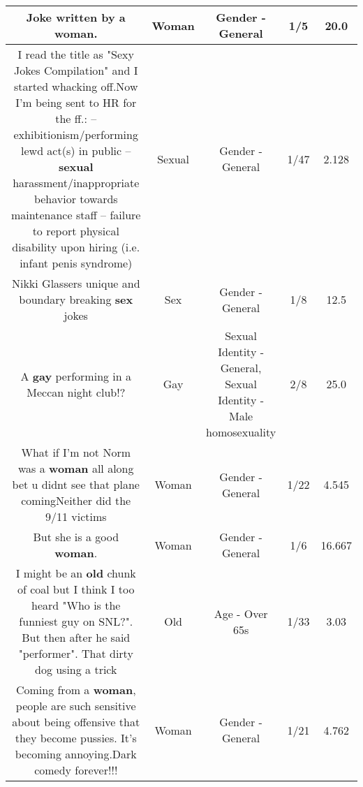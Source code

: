 \documentclass[11pt]{article}
\newlength\mylength
\begin{document}
\begin{center}
\begin{longtable}{|C{.65\mylength}|C{.30\mylength}|C{.12\mylength}|C{.12\mylength}|C{.12\mylength}|}
  \small Joke written by a \textbf{woman}.\normalsize   & Woman & Gender - General & 1/5 & 20.0 \\  \hline
  \small I read the title as "Sexy Jokes Compilation" and I started whacking off.Now I'm being sent to HR for the ff.:  -- exhibitionism/performing lewd act(s) in public  -- \textbf{sexual} harassment/inappropriate behavior towards maintenance staff  -- failure to report physical disability upon hiring (i.e. infant penis syndrome)\normalsize   & Sexual & Gender - General & 1/47 & 2.128 \\  \hline
  \small Nikki Glassers unique and boundary breaking \textbf{sex} jokes\normalsize   & Sex & Gender - General & 1/8 & 12.5 \\  \hline
  \small A \textbf{g\textbf{ay}} performing in a Meccan night club!?\normalsize   & Gay & Sexual Identity - General, Sexual Identity - Male homosexuality & 2/8 & 25.0 \\  \hline
  \small What if I'm not Norm was a \textbf{woman} all along bet u didnt see that  plane comingNeither did the 9/11 victims\normalsize   & Woman & Gender - General & 1/22 & 4.545 \\  \hline
  \small But she is a good \textbf{woman}.\normalsize   & Woman & Gender - General & 1/6 & 16.667 \\  \hline
  \small I might be an \textbf{old} chunk of coal but I think I too heard "Who is the funniest guy on SNL?". But then after he said "performer". That dirty dog using a trick\normalsize   & Old & Age - Over 65s & 1/33 & 3.03 \\  \hline
  \small Coming from a \textbf{woman}, people are such sensitive about being offensive that they become pussies. It's becoming annoying.Dark comedy forever!!!\normalsize   & Woman & Gender - General & 1/21 & 4.762 \\  \hline

\end{longtable}
\end{center}
\end{document}
